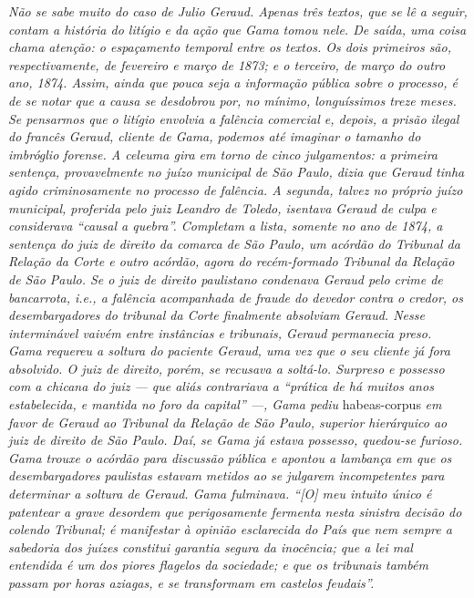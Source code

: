 \begin{argumento}
\emph{Não se sabe muito do caso de Julio Geraud. Apenas três textos, que
se lê a seguir, contam a história do litígio e da ação que Gama tomou
nele. De saída, uma coisa chama atenção: o espaçamento temporal entre os
textos. Os dois primeiros são, respectivamente, de fevereiro e março de
1873; e o terceiro, de março do outro ano, 1874. Assim, ainda que pouca
seja a informação pública sobre o processo, é de se notar que a causa se
desdobrou por, no mínimo, longuíssimos treze meses. Se pensarmos que o
litígio envolvia a falência comercial e, depois, a prisão ilegal do
francês Geraud, cliente de Gama, podemos até imaginar o tamanho do
imbróglio forense. A celeuma gira em torno de cinco julgamentos: a
primeira sentença, provavelmente no juízo municipal de São Paulo, dizia
que Geraud tinha agido criminosamente no processo de falência. A
segunda, talvez no próprio juízo municipal, proferida pelo juiz Leandro
de Toledo, isentava Geraud de culpa e considerava ``causal a quebra''.
Completam a lista, somente no ano de 1874, a sentença do juiz de direito
da comarca de São Paulo, um acórdão do Tribunal da Relação da Corte e
outro acórdão, agora do recém-formado Tribunal da Relação de São Paulo.
Se o juiz de direito paulistano condenava Geraud pelo crime de
bancarrota, i.e., a falência acompanhada de fraude do devedor contra o
credor, os desembargadores do tribunal da Corte finalmente absolviam
Geraud. Nesse interminável vaivém entre instâncias e tribunais, Geraud
permanecia preso. Gama requereu a soltura do paciente Geraud, uma vez
que o seu cliente já fora absolvido. O juiz de direito, porém, se
recusava a soltá-lo. Surpreso e possesso com a chicana do juiz --- que
aliás contrariava a ``prática de há muitos anos estabelecida, e mantida
no foro da capital'' ---, Gama pediu} habeas-corpus \emph{em favor de
Geraud ao Tribunal da Relação de São Paulo, superior hierárquico ao juiz
de direito de São Paulo. Daí, se Gama já estava possesso, quedou-se
furioso. Gama trouxe o acórdão para discussão pública e apontou a
lambança em que os desembargadores paulistas estavam metidos ao se
julgarem incompetentes para determinar a soltura de Geraud. Gama
fulminava. ``{[}O{]} meu intuito único é patentear a grave desordem que
perigosamente fermenta nesta sinistra decisão do colendo Tribunal; é
manifestar à opinião esclarecida do País que nem sempre a sabedoria dos
juízes constitui garantia segura da inocência; que a lei mal entendida é
um dos piores flagelos da sociedade; e que os tribunais também passam
por horas aziagas, e se transformam em castelos feudais''.}
\end{argumento}

